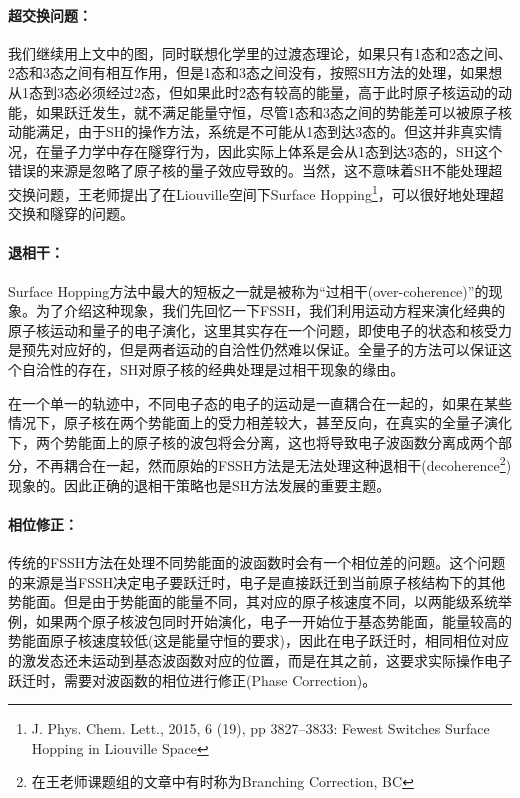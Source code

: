 \documentclass{article}
\numberwithin{equation}{section}
\begin{document}
        \paragraph{超交换问题：}我们继续用上文中的图，同时联想化学里的过渡态理论，如果只有1态和2态之间、2态和3态之间有相互作用，但是1态和3态之间没有，按照SH方法的处理，如果想从1态到3态必须经过2态，但如果此时2态有较高的能量，高于此时原子核运动的动能，如果跃迁发生，就不满足能量守恒，尽管1态和3态之间的势能差可以被原子核动能满足，由于SH的操作方法，系统是不可能从1态到达3态的。但这并非真实情况，在量子力学中存在隧穿行为，因此实际上体系是会从1态到达3态的，SH这个错误的来源是忽略了原子核的量子效应导致的。当然，这不意味着SH不能处理超交换问题，王老师提出了在Liouville空间下Surface Hopping\footnote{J. Phys. Chem. Lett., 2015, 6 (19), pp 3827–3833: Fewest Switches Surface Hopping in Liouville Space}，可以很好地处理超交换和隧穿的问题。

        \paragraph{退相干：}Surface Hopping方法中最大的短板之一就是被称为“过相干(over-coherence)”的现象。为了介绍这种现象，我们先回忆一下FSSH，我们利用运动方程来演化经典的原子核运动和量子的电子演化，这里其实存在一个问题，即使电子的状态和核受力是预先对应好的，但是两者运动的自洽性仍然难以保证。全量子的方法可以保证这个自洽性的存在，SH对原子核的经典处理是过相干现象的缘由。

        在一个单一的轨迹中，不同电子态的电子的运动是一直耦合在一起的，如果在某些情况下，原子核在两个势能面上的受力相差较大，甚至反向，在真实的全量子演化下，两个势能面上的原子核的波包将会分离，这也将导致电子波函数分离成两个部分，不再耦合在一起，然而原始的FSSH方法是无法处理这种退相干(decoherence\footnote{在王老师课题组的文章中有时称为Branching Correction, BC})现象的。因此正确的退相干策略也是SH方法发展的重要主题。
        
        \paragraph{相位修正：}传统的FSSH方法在处理不同势能面的波函数时会有一个相位差的问题。这个问题的来源是当FSSH决定电子要跃迁时，电子是直接跃迁到当前原子核结构下的其他势能面。但是由于势能面的能量不同，其对应的原子核速度不同，以两能级系统举例，如果两个原子核波包同时开始演化，电子一开始位于基态势能面，能量较高的势能面原子核速度较低(这是能量守恒的要求)，因此在电子跃迁时，相同相位对应的激发态还未运动到基态波函数对应的位置，而是在其之前，这要求实际操作电子跃迁时，需要对波函数的相位进行修正(Phase Correction)。
  
\end{document}
